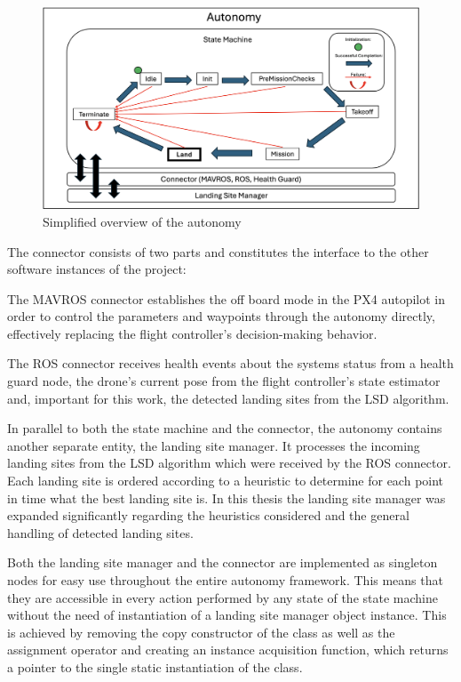 \begin{figure}[ht!]
    \centering
    \includegraphics[scale=0.22]{images/system_overview/autonomy.png}
    \caption{Simplified overview of the autonomy}
    \label{fig:autonomy}
\end{figure}

The connector consists of two parts and constitutes the interface to the other software instances of the project:

The MAVROS connector establishes the off board mode in the PX4 autopilot in order to control the parameters and waypoints through the autonomy directly, effectively replacing the flight controller's decision-making behavior. 

The ROS connector receives health events about the systems status from a health guard node, the drone's current pose from the flight controller's state estimator and, important for this work, the detected landing sites from the LSD algorithm.

In parallel to both the state machine and the connector, the autonomy contains another separate entity, the landing site manager. It processes the incoming landing sites from the LSD algorithm which were received by the ROS connector. Each landing site is ordered according to a heuristic to determine for each point in time what the best landing site is. In this thesis the landing site manager was expanded significantly regarding the heuristics considered and the general handling of detected landing sites. 

Both the landing site manager and the connector are implemented as singleton nodes for easy use throughout the entire autonomy framework. This means that they are accessible in every action performed by any state of the state machine without the need of instantiation of a landing site manager object instance. This is achieved by removing the copy constructor of the class as well as the assignment operator and creating an instance acquisition function, which returns a pointer to the single static instantiation of the class.

